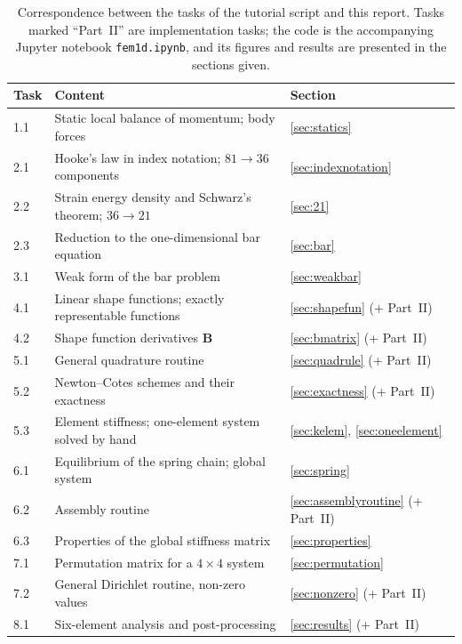\documentclass[11pt,a4paper]{article}
\numberwithin{equation}{section}
\theoremstyle{remark}
\newcommand{\bB}{\bm{B}}
\begin{document}
\begin{table}[ht]
  \centering
  \caption{Correspondence between the tasks of the tutorial script and this report. Tasks
    marked ``Part~II'' are implementation tasks; the code is the accompanying Jupyter notebook
    \texttt{fem1d.ipynb}, and its figures and results are presented in the sections given.}
  \label{tab:taskmap}
  \begin{tabularx}{\linewidth}{lXl}
    \toprule
    Task & Content & Section \\
    \midrule
    1.1 & Static local balance of momentum; body forces & \ref{sec:statics} \\
    2.1 & Hooke's law in index notation; $81 \to 36$ components & \ref{sec:indexnotation} \\
    2.2 & Strain energy density and Schwarz's theorem; $36 \to 21$ & \ref{sec:21} \\
    2.3 & Reduction to the one-dimensional bar equation & \ref{sec:bar} \\
    3.1 & Weak form of the bar problem & \ref{sec:weakbar} \\
    4.1 & Linear shape functions; exactly representable functions & \ref{sec:shapefun} (+ Part~II) \\
    4.2 & Shape function derivatives $\bB$ & \ref{sec:bmatrix} (+ Part~II) \\
    5.1 & General quadrature routine & \ref{sec:quadrule} (+ Part~II) \\
    5.2 & Newton--Cotes schemes and their exactness & \ref{sec:exactness} (+ Part~II) \\
    5.3 & Element stiffness; one-element system solved by hand & \ref{sec:kelem}, \ref{sec:oneelement} \\
    6.1 & Equilibrium of the spring chain; global system & \ref{sec:spring} \\
    6.2 & Assembly routine & \ref{sec:assemblyroutine} (+ Part~II) \\
    6.3 & Properties of the global stiffness matrix & \ref{sec:properties} \\
    7.1 & Permutation matrix for a $4\times4$ system & \ref{sec:permutation} \\
    7.2 & General Dirichlet routine, non-zero values & \ref{sec:nonzero} (+ Part~II) \\
    8.1 & Six-element analysis and post-processing & \ref{sec:results} (+ Part~II) \\
    \bottomrule
  \end{tabularx}
\end{table}
\end{document}
